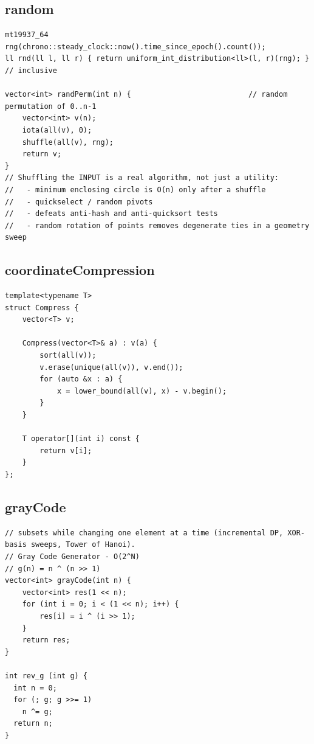 \documentclass[9pt,a4paper,twocolumn]{extarticle}
\begin{document}
\filbreak
\subsection{random}
\nopagebreak
\begin{lstlisting}
mt19937_64 rng(chrono::steady_clock::now().time_since_epoch().count());
ll rnd(ll l, ll r) { return uniform_int_distribution<ll>(l, r)(rng); }   // inclusive

vector<int> randPerm(int n) {                           // random permutation of 0..n-1
    vector<int> v(n);
    iota(all(v), 0);
    shuffle(all(v), rng);
    return v;
}
// Shuffling the INPUT is a real algorithm, not just a utility:
//   - minimum enclosing circle is O(n) only after a shuffle
//   - quickselect / random pivots
//   - defeats anti-hash and anti-quicksort tests
//   - random rotation of points removes degenerate ties in a geometry sweep
\end{lstlisting}

\filbreak
\subsection{coordinateCompression}
\nopagebreak
\begin{lstlisting}
template<typename T>
struct Compress {
    vector<T> v;

    Compress(vector<T>& a) : v(a) {
        sort(all(v));
        v.erase(unique(all(v)), v.end());
        for (auto &x : a) {
            x = lower_bound(all(v), x) - v.begin();
        }
    }

    T operator[](int i) const {
        return v[i];
    }
};
\end{lstlisting}

\filbreak
\subsection{grayCode}
\nopagebreak
\begin{lstlisting}
// subsets while changing one element at a time (incremental DP, XOR-basis sweeps, Tower of Hanoi).
// Gray Code Generator - O(2^N)
// g(n) = n ^ (n >> 1)
vector<int> grayCode(int n) {
    vector<int> res(1 << n);
    for (int i = 0; i < (1 << n); i++) {
        res[i] = i ^ (i >> 1);
    }
    return res;
}

int rev_g (int g) {
  int n = 0;
  for (; g; g >>= 1)
    n ^= g;
  return n;
}
\end{lstlisting}
\end{document}
